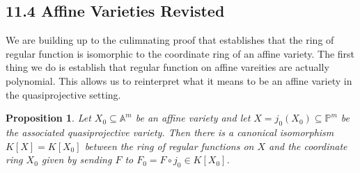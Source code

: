\documentclass[40pt]{article}
\newcommand{\Proj}{\mathbb{P}}
\newcommand{\A}{\mathbb{A}}
\newtheorem{proposition}{Proposition}[section]
\theoremstyle{remark}
\begin{document}
				\subsection{11.4 Affine Varieties Revisted}
				We are building up to the culimnating proof that establishes that the ring of regular function is isomorphic to the coordinate ring of an affine variety. The first thing we do is establish that regular function on affine vareities are actually polynomial. This allows us to reinterpret what it means to be an affine variety in the quasiprojective setting. 
				\begin{proposition}
					Let $X_0 \subseteq \A^m$ be an affine variety and let $X = j_0(X_0) \subseteq \Proj^m$ be the associated quasiprojective variety. Then there is a canonical isomorphism $K[X] = K[X_0]$ between the ring of regular functions on $X$ and the coordinate ring $X_0$ given by sending $F$ to $F_0 =  F \circ j_0 \in K[X_0]$.
				\end{proposition}
\end{document}
